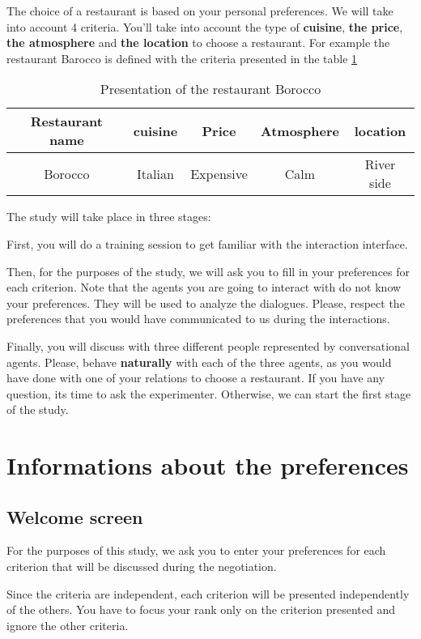 \documentclass [french]{paper}
\begin{document}
		The choice of a restaurant is based on your personal preferences. We will take into account 4 criteria. You'll take into account the type of \textbf {cuisine}, \textbf {the price}, \textbf {the atmosphere} and \textbf {the location} to choose a restaurant. For example the restaurant Barocco is defined with the criteria presented in the table \ref{teb:exEn}
		
			\begin{table}[h]
		\begin{tabular} {|c|c|c|c|c|}
			\hline
			Restaurant name & cuisine & Price & Atmosphere & location \\
			\hline
			Borocco & Italian & Expensive & Calm & River side \\
			\hline 
		\end{tabular}
		\label{teb:exEn}
		\caption{Presentation of the restaurant Borocco}
	\end{table}
	
	The study will take place in three stages:
	
	First, you will do a training session to get familiar with the interaction interface.
	
	Then, for the purposes of the study, we will ask you to fill in your preferences for each criterion.  Note that the agents you are going to interact with do not know your preferences. They will be used to analyze the dialogues. Please, respect the preferences that you would have communicated to us during the interactions.
	
	Finally, you will discuss with three different people represented by conversational agents. Please, behave \textbf{naturally} with each of the three agents, as you would have done with one of your relations to choose a restaurant.
	If you have any question, its time to ask the experimenter. Otherwise, we can start the first stage of the study.
	\section{Informations about the preferences}
		\subsection{Welcome screen}
	
		For the purposes of this study, we ask you to enter your preferences for each criterion that will be discussed during the negotiation.
		
		Since the criteria are independent, each criterion will be presented independently of the others. You have to focus your rank only on the criterion presented and ignore the other criteria.
		
\end{document}
